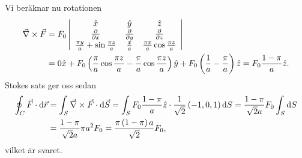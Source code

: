 \documentclass[%
oneside,                 %
final,                   %
10pt]{article}
\newenvironment{notice_mdfboxadmon}[1][]{
\begin{notice_mdfboxmdframed}[frametitle=#1]
}
{
\end{notice_mdfboxmdframed}
}
\begin{document}
\begin{notice_mdfboxadmon}
Vi beräknar nu rotationen 
\begin{align}
  \vec{\nabla} \times \vec{F} &= F_0 \left|\begin{array}{ccc}
\hat{x} & \hat{y} & \hat{z} \\
\frac{\partial}{\partial x} & \frac{\partial}{\partial y} &
\frac{\partial}{\partial z} \\
\frac{\pi y}{a} + \sin \frac{\pi z}{a} & \frac{x}{a} & \frac{\pi x}{a}
\cos \frac{\pi z}{a} \\
\end{array} 
\right|  \nonumber \\
&= 0 \hat{x} + F_0 \left(\frac{\pi}{a} \cos\frac{\pi z}{a} - \frac{\pi}{a}
\cos\frac{\pi z}{a}\right) \hat{y} + F_0\left(\frac{1}{a} - \frac{\pi}{a}
\right) \hat{z} = F_0 \frac{1 - \pi}{a} \hat{z}.
\end{align}
Stokes sats ger oss sedan
\begin{align}
  \oint_C \vec{F} \cdot \mbox{d}\vec{r} &= \int_S \vec{\nabla} \times \vec{F} \cdot \mbox{d}
\vec{S} = \int_S F_0 \frac{1 - \pi}{a} \hat{z} \cdot \frac{1}{\sqrt{2}} 
\left(-1,0,1\right) \mbox{d}S = \frac{1 - \pi}{\sqrt{2}a} F_0
\int_S \mbox{d}S \nonumber \\ 
&= \frac{1 - \pi}{\sqrt{2}a} \pi a^2 F_0 =  \frac{\pi \left(1-\pi\right)a}{\sqrt{2}} F_0,
\end{align}
vilket är svaret.
\end{notice_mdfboxadmon} %
\end{document}
